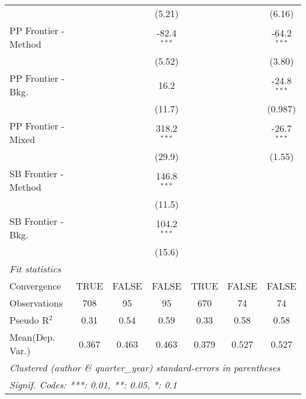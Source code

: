 \begin{tabular}{lcccccc}
                        &         &              & (5.21)        &         &                & (6.16)\\   
   PP Frontier - Method &         &              & -82.4$^{***}$ &         &                & -64.2$^{***}$\\   
                        &         &              & (5.52)        &         &                & (3.80)\\   
   PP Frontier - Bkg.   &         &              & 16.2          &         &                & -24.8$^{***}$\\   
                        &         &              & (11.7)        &         &                & (0.987)\\   
   PP Frontier - Mixed  &         &              & 318.2$^{***}$ &         &                & -26.7$^{***}$\\   
                        &         &              & (29.9)        &         &                & (1.55)\\   
   SB Frontier - Method &         &              & 146.8$^{***}$ &         &                &   \\   
                        &         &              & (11.5)        &         &                &   \\   
   SB Frontier - Bkg.   &         &              & 104.2$^{***}$ &         &                &   \\   
                        &         &              & (15.6)        &         &                &   \\   
   \midrule
   \emph{Fit statistics}\\
   Convergence          &TRUE     & FALSE        & FALSE         & TRUE    & FALSE          & FALSE\\  
   Observations         & 708     & 95           & 95            & 670     & 74             & 74\\  
   Pseudo R$^2$         & 0.31    & 0.54         & 0.59          & 0.33    & 0.58           & 0.58\\  
Mean(Dep. Var.) & 0.367 & 0.463 & 0.463 & 0.379 & 0.527 & 0.527 \\
   \midrule \midrule
   \multicolumn{7}{l}{\emph{Clustered (author \& quarter\_year) standard-errors in parentheses}}\\
   \multicolumn{7}{l}{\emph{Signif. Codes: ***: 0.01, **: 0.05, *: 0.1}}\\
\end{tabular}
\par\endgroup
